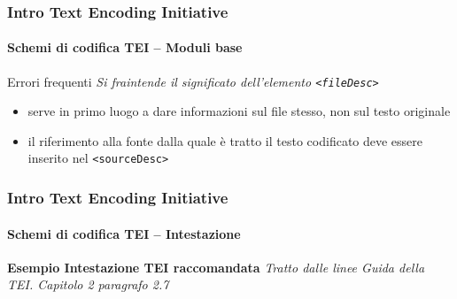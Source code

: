 \begin{frame}
	\frametitle{Intro Text Encoding Initiative}
	\framesubtitle{Schemi di codifica TEI – Moduli base}
	\addtocounter{nframe}{1}

	\begin{block}{Errori frequenti}
        \textit{Si fraintende il significato dell’elemento \texttt{<fileDesc>}}
        \begin{itemize}
            \item serve in primo luogo a dare informazioni sul file stesso, non sul testo originale
            \item il riferimento alla fonte dalla quale è tratto il testo codificato
            deve essere inserito nel \texttt{<sourceDesc>}
        \end{itemize}
    \end{block}

\end{frame}

\begin{frame}
	\frametitle{Intro Text Encoding Initiative}
	\framesubtitle{Schemi di codifica TEI – Intestazione}
	\addtocounter{nframe}{1}

        \textbf{Esempio Intestazione TEI raccomandata}
        \textit{Tratto dalle linee Guida della TEI. Capitolo 2 paragrafo 2.7}
        \\\url{}

\end{frame}

%

%

%

%

%

